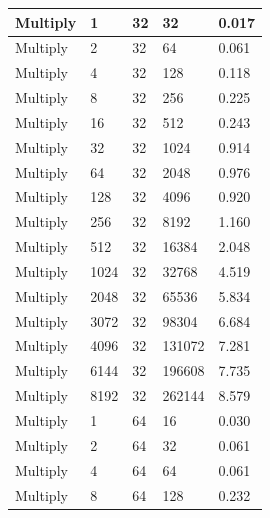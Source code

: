 \documentclass{article}
\begin{document}
\begin{longtable}{|l|l|l|l|l|}
Multiply           & 1    & 32          & 32                & 0.017             \\ \hline
Multiply           & 2    & 32          & 64                & 0.061             \\ \hline
Multiply           & 4    & 32          & 128               & 0.118             \\ \hline
Multiply           & 8    & 32          & 256               & 0.225             \\ \hline
Multiply           & 16   & 32          & 512               & 0.243             \\ \hline
Multiply           & 32   & 32          & 1024              & 0.914             \\ \hline
Multiply           & 64   & 32          & 2048              & 0.976             \\ \hline
Multiply           & 128  & 32          & 4096              & 0.920             \\ \hline
Multiply           & 256  & 32          & 8192              & 1.160             \\ \hline
Multiply           & 512  & 32          & 16384             & 2.048             \\ \hline
Multiply           & 1024 & 32          & 32768             & 4.519             \\ \hline
Multiply           & 2048 & 32          & 65536             & 5.834             \\ \hline
Multiply           & 3072 & 32          & 98304             & 6.684             \\ \hline
Multiply           & 4096 & 32          & 131072            & 7.281             \\ \hline
Multiply           & 6144 & 32          & 196608            & 7.735             \\ \hline
Multiply           & 8192 & 32          & 262144            & 8.579             \\ \hline
Multiply           & 1    & 64          & 16                & 0.030             \\ \hline
Multiply           & 2    & 64          & 32                & 0.061             \\ \hline
Multiply           & 4    & 64          & 64                & 0.061             \\ \hline
Multiply           & 8    & 64          & 128               & 0.232             \\ \hline

\end{longtable}
\end{document}
